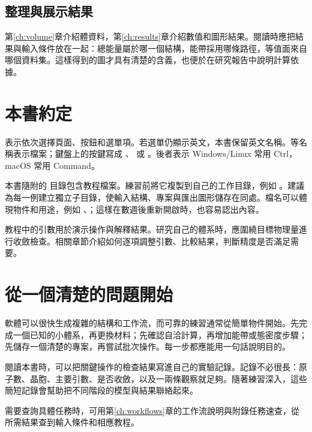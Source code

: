 \subsection{整理與展示結果}
第\ref{ch:volume}章介紹體資料，第\ref{ch:results}章介紹數值和圖形結果。閱讀時應把結果與輸入條件放在一起：總能量屬於哪一個結構，能帶採用哪條路徑，等值面來自哪個資料集。這樣得到的圖才具有清楚的含義，也便於在研究報告中說明計算依據。

\section{本書約定}
表示依次選擇頁面、按鈕和選單項。若選單仍顯示英文，本書保留英文名稱。等名稱表示檔案；鍵盤上的按鍵寫成 、 或 。後者表示 Windows/Linux 常用 Ctrl，macOS 常用 Command。

本書隨附的  目錄包含教程檔案。練習前將它複製到自己的工作目錄，例如 。建議為每一例建立獨立子目錄，使輸入結構、專案與匯出圖形儲存在同處。檔名可以體現物件和用途，例如 、；這樣在數週後重新開啟時，也容易認出內容。

教程中的引數用於演示操作與解釋結果。研究自己的體系時，應圍繞目標物理量進行收斂檢查。相關章節介紹如何逐項調整引數、比較結果，判斷精度是否滿足需要。

\section{從一個清楚的問題開始}
軟體可以很快生成複雜的結構和工作流，而可靠的練習通常從簡單物件開始。先完成一個已知的小體系，再更換材料；先確認自洽計算，再增加能帶或態密度步驟；先儲存一個清楚的專案，再嘗試批次操作。每一步都應能用一句話說明目的。

閱讀本書時，可以把關鍵操作的檢查結果寫進自己的實驗記錄。記錄不必很長：原子數、晶胞、主要引數、是否收斂，以及一兩條觀察就足夠。隨著練習深入，這些簡短記錄會幫助把不同階段的模型與結果聯絡起來。


需要查詢具體任務時，可用第\ref{ch:workflows}章的工作流說明與附錄任務速查，從所需結果查到輸入條件和相應教程。
